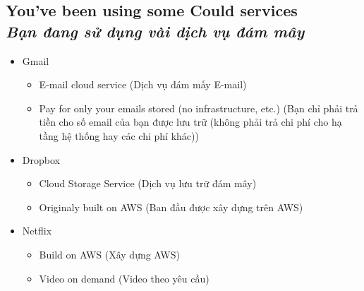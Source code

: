 \subsection[You've been using some Could services]{\textbf{You've been using some Could services } \\ \textit{Bạn đang sử dụng vài dịch vụ đám mây}}
\begin{itemize}
	\item Gmail
	\begin{itemize}
		\item E-mail cloud service (Dịch vụ đám mấy E-mail)
		\item Pay for only your emails stored (no infrastructure, etc.) (Bạn chỉ phải trả tiền cho số email của bạn được lưu trữ (không phải trả chi phí cho hạ tầng hệ thống hay các chi phí khác))
	\end{itemize}
	\item Dropbox 
	\begin{itemize}
		\item Cloud Storage Service (Dịch vụ lưu trữ đám mây)
		\item Originaly built on AWS (Ban đầu được xây dựng trên AWS)
	\end{itemize}
	\item Netflix
	\begin{itemize}
		\item Build on AWS (Xây dựng AWS)
		\item Video on demand (Video theo yêu cầu)
	\end{itemize}
\end{itemize}

